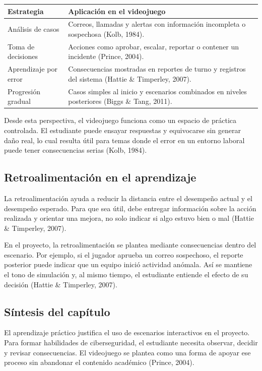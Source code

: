 \begin{longtable}{|p{}|p{}|}
\hline
\textbf{Estrategia} & \textbf{Aplicación en el videojuego} \\
\hline
Análisis de casos & Correos, llamadas y alertas con información incompleta o sospechosa (Kolb, 1984). \\
\hline
Toma de decisiones & Acciones como aprobar, escalar, reportar o contener un incidente (Prince, 2004). \\
\hline
Aprendizaje por error & Consecuencias mostradas en reportes de turno y registros del sistema (Hattie \& Timperley, 2007). \\
\hline
Progresión gradual & Casos simples al inicio y escenarios combinados en niveles posteriores (Biggs \& Tang, 2011). \\
\hline
\end{longtable}

Desde esta perspectiva, el videojuego funciona como un espacio de práctica controlada. El estudiante puede ensayar respuestas y equivocarse sin generar daño real, lo cual resulta útil para temas donde el error en un entorno laboral puede tener consecuencias serias (Kolb, 1984).

\subsection{Retroalimentación en el aprendizaje}

La retroalimentación ayuda a reducir la distancia entre el desempeño actual y el desempeño esperado. Para que sea útil, debe entregar información sobre la acción realizada y orientar una mejora, no solo indicar si algo estuvo bien o mal (Hattie \& Timperley, 2007).

En el proyecto, la retroalimentación se plantea mediante consecuencias dentro del escenario. Por ejemplo, si el jugador aprueba un correo sospechoso, el reporte posterior puede indicar que un equipo inició actividad anómala. Así se mantiene el tono de simulación y, al mismo tiempo, el estudiante entiende el efecto de su decisión (Hattie \& Timperley, 2007).

\subsection{Síntesis del capítulo}

El aprendizaje práctico justifica el uso de escenarios interactivos en el proyecto. Para formar habilidades de ciberseguridad, el estudiante necesita observar, decidir y revisar consecuencias. El videojuego se plantea como una forma de apoyar ese proceso sin abandonar el contenido académico (Prince, 2004).

\newpage
